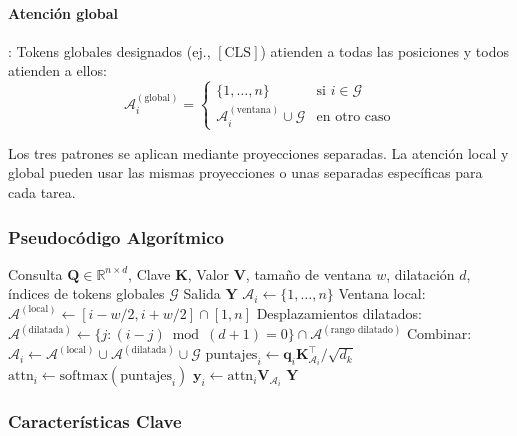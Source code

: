 \documentclass[11pt,a4paper]{article}
\begin{document}
\paragraph{Atención global}: Tokens globales designados (ej., $[\text{CLS}]$) atienden a todas las posiciones y todos atienden a ellos:
\[
\mathcal{A}_i^{(\text{global})} = \begin{cases}
\{1, \ldots, n\} & \text{si } i \in \mathcal{G} \\
\mathcal{A}_i^{(\text{ventana})} \cup \mathcal{G} & \text{en otro caso}
\end{cases}
\]

Los tres patrones se aplican mediante proyecciones separadas. La atención local y global pueden usar las mismas proyecciones o unas separadas específicas para cada tarea.

\subsubsection{Pseudocódigo Algorítmico}

\begin{algorithm}[H]
\caption{Longformer: Ventana Deslizante + Dilatada + Global}
\begin{algorithmic}[1]
\Require Consulta $\mathbf{Q} \in \mathbb{R}^{n \times d}$, Clave $\mathbf{K}$, Valor $\mathbf{V}$, tamaño de ventana $w$, dilatación $d$, índices de tokens globales $\mathcal{G}$
\Ensure Salida $\mathbf{Y}$
        \State $\mathcal{A}_i \gets \{1, \ldots, n\}$ 
    \Else
        \State Ventana local: $\mathcal{A}^{(\text{local})} \gets [i - w/2, i + w/2] \cap [1, n]$
        \State Desplazamientos dilatados: $\mathcal{A}^{(\text{dilatada})} \gets \{j : (i-j) \bmod (d+1) = 0\} \cap \mathcal{A}^{(\text{rango dilatado})}$
        \State Combinar: $\mathcal{A}_i \gets \mathcal{A}^{(\text{local})} \cup \mathcal{A}^{(\text{dilatada})} \cup \mathcal{G}$
    \EndIf
    \State $\text{puntajes}_i \gets \mathbf{q}_i \mathbf{K}_{\mathcal{A}_i}^\top / \sqrt{d_k}$
    \State $\text{attn}_i \gets \text{softmax}(\text{puntajes}_i)$
    \State $\mathbf{y}_i \gets \text{attn}_i \mathbf{V}_{\mathcal{A}_i}$
\EndFor
\Return $\mathbf{Y}$
\end{algorithmic}
\end{algorithm}

\subsubsection{Características Clave}
\end{document}
